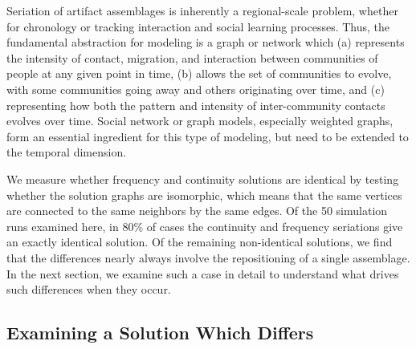 Seriation of artifact assemblages is inherently a regional-scale
problem, whether for chronology or tracking interaction and social
learning processes. Thus, the fundamental abstraction for modeling is a
graph or network which (a) represents the intensity of contact,
migration, and interaction between communities of people at any given
point in time, (b) allows the set of communities to evolve, with some
communities going away and others originating over time, and (c)
representing how both the pattern and intensity of inter-community
contacts evolves over time. Social network or graph models, especially
weighted graphs, form an essential ingredient for this type of modeling,
but need to be extended to the temporal dimension.

We measure whether frequency and
continuity solutions are identical by testing whether the solution
graphs are isomorphic, which means that the same vertices are connected
to the same neighbors by the same edges. Of the 50 simulation runs
examined here, in 80\% of cases the continuity and frequency seriations
give an exactly identical solution. Of the remaining non-identical
solutions, we find that the differences nearly always involve the
repositioning of a single assemblage. In the next section, we examine
such a case in detail to understand what drives such differences when
they occur.

\subsection{Examining a Solution Which
Differs}\label{examining-a-solution-which-differs}

